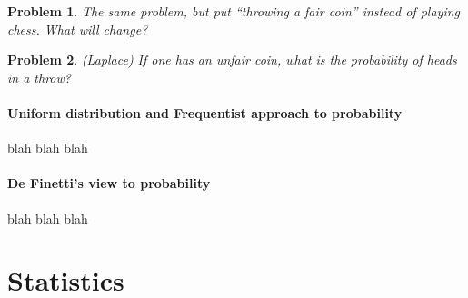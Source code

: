 \documentclass{article}
\newtheorem{prb}{Problem}
\begin{document}
\begin{prb}
  The same problem, but put ``throwing a fair coin'' instead of playing chess. What will change?
\end{prb}

\begin{prb}
  (Laplace) If one has an unfair coin, what is the probability of heads in a throw?
\end{prb}

\subsection{Uniform distribution and Frequentist approach to probability}
blah blah blah

\subsection{De Finetti's view to probability}
blah blah blah

\part{Statistics}
\end{document}
